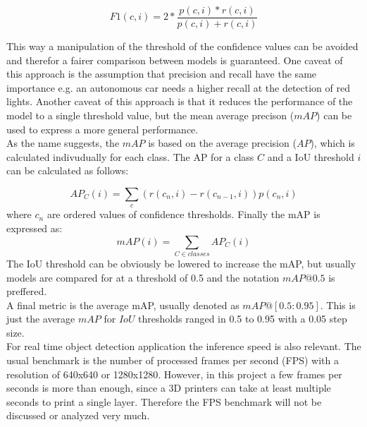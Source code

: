 \begin{equation}
F1(c,i) = 2 * \frac{ p(c,i) * r(c,i)}{p(c,i) + r(c,i)}
\end{equation}

This way a manipulation of the threshold of the confidence values can be avoided and therefor a fairer comparison between models is guaranteed. One caveat of this approach is the assumption that precision and recall have the same importance e.g. an autonomous car needs a higher recall at the detection of red lights. Another caveat of this approach is that it reduces the performance of the model to a single threshold value, but the mean average precison ($mAP$) can be used to express a more general performance. \\
As the name suggests, the $mAP$ is based on the average precision ($AP$), which is calculated indivudually for each class. The AP for a class $C$ and a IoU threshold $i$ can be calculated as follows:

\begin{equation}
AP_C(i) = \sum_{c}{(r(c_{n},i) - r({c_{n-1},i}))p(c_n, i)}
\end{equation}
where $c_n$ are ordered values of confidence thresholds. Finally the mAP is expressed as:
\begin{equation}
mAP(i) = \sum_{C \in classes}{AP_C(i)}
\end{equation}
The IoU threshold can be obviously be lowered to increase the mAP, but usually models are compared for at a threshold of 0.5 and the notation $mAP@0.5$ is preffered. \\
A final metric is the average mAP, usually denoted as $mAP@[0.5:0.95]$. This is just the average $mAP$ for $IoU$ thresholds ranged in 0.5 to 0.95 with a 0.05 step size. \\
For real time object detection application the inference speed is also relevant. The usual benchmark is the number of processed frames per second (FPS) with a resolution of 640x640 or 1280x1280. However, in this project a few frames per seconds is more than enough, since a 3D printers can take at least multiple seconds to print a single layer. Therefore the FPS benchmark will not be discussed or analyzed very much.
